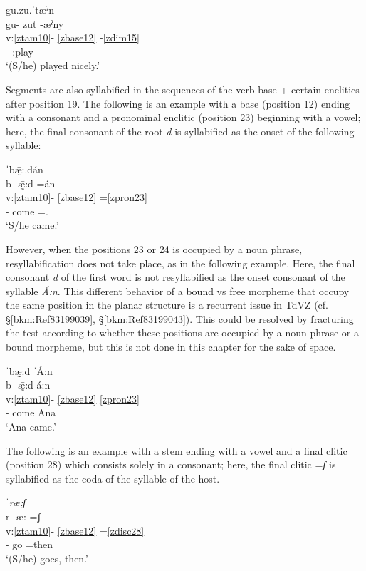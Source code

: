 \documentclass[output=paper]{langscibook}
\begin{document}
\ea\label{bkm:Ref82531319}
{gu.zu.ˈtæˀn}\\
\glll gu- zut -æˀny\\
v:\ref{ztam10}- \ref{zbase12} {}-\ref{zdim15} \\
\Compl{}- \Compl{}:play \Dim{}\\
\glt `(S/he) played nicely.'
\z

Segments are also syllabified in the sequences of the verb base + certain enclitics after position 19. The following is an example with a base (position 12) ending with a consonant and a pronominal enclitic (position 23) beginning with a vowel; here, the final consonant of the root \textit{d} is syllabified as the onset of the following syllable: 

\ea\label{ex:key:zap:63}
{ˈbǣ̰:.dán}\\
\glll b- ǣ̰:d =án\\
v:\ref{ztam10}- \ref{zbase12} =\ref{zpron23} \\
\Compl{}- come =\Third\Sg.\Inf{}\\
\glt `S/he came.'
\z

However, when the positions 23 or 24 is occupied by a noun phrase, resyllabification does not take place, as in the following example. Here, the final consonant \textit{d} of the first word is not resyllabified as the onset consonant of the syllable \textit{Á:n}. This different behavior of a bound vs free morpheme that occupy the same position in the planar structure is a recurrent issue in TdVZ (cf. §\ref{bkm:Ref83199039}, §\ref{bkm:Ref83199043}). This could be resolved by fracturing the test according to whether these positions are occupied by a noun phrase or a bound morpheme, but this is not done in this chapter for the sake of space. 

\ea\label{ex:key:zap:64}
{ˈbǣ̰:d ˈÁ:n}\\
\glll b- ǣ̰:d á:n\\
v:\ref{ztam10}- \ref{zbase12} \ref{zpron23} \\
\Compl{}- come Ana\\
\glt `Ana came.'
\z

The following is an example with a stem ending with a vowel and a final clitic (position 28) which consists solely in a consonant; here, the final clitic =\textit{ʃ} is syllabified as the coda of the syllable of the host.

\ea\label{ex:key:zap:65}
{\textit{ˈræ:ʃ}}\\
\glll r- æ: =\textup{ʃ}\\
v:\ref{ztam10}- \ref{zbase12} =\ref{zdisc28} \\
\Hab{}- go =then\\
\glt  `(S/he) goes, then.'
\z
\end{document}
